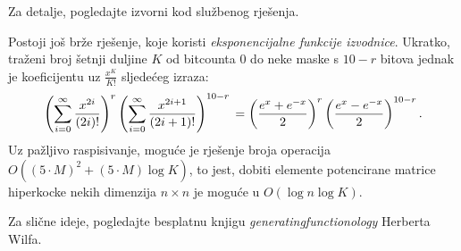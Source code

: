Za detalje, pogledajte izvorni kod službenog rješenja.

Postoji još brže rješenje, koje koristi \emph{eksponencijalne funkcije
izvodnice}. Ukratko, traženi broj šetnji duljine $K$ od bitcounta $0$
do neke maske s $10-r$ bitova jednak je koeficijentu
uz $\frac{x^K}{K!}$ sljedećeg izraza:
\[
  \left(\sum_{i=0}^{\infty} \frac{x^{2i}}{(2i)!}\right)^{r}
  \left(\sum_{i=0}^{\infty} \frac{x^{2i+1}}{(2i+1)!}\right)^{10-r} \\
  = \left( \frac{e^x + e^{-x}}{2} \right)^{r}
  \left( \frac{e^x - e^{-x}}{2} \right)^{10-r}.
\]
Uz pažljivo raspisivanje, moguće je rješenje broja operacija 
$O((5\cdot M)^2 + (5\cdot M) \log K)$, to jest, dobiti elemente
potencirane matrice hiperkocke
nekih dimenzija $n \times n$ je moguće u $O(\log n \log K)$.

Za slične ideje, pogledajte besplatnu knjigu
\textit{generatingfunctionology} Herberta Wilfa.








